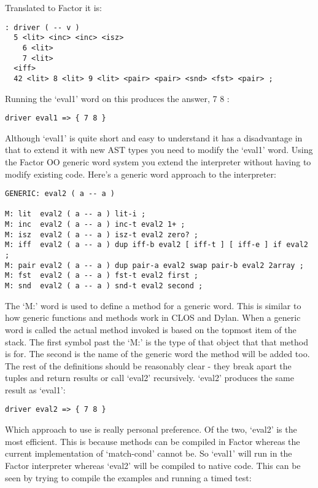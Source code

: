 Translated to Factor it is:

\begin{verbatim}
: driver ( -- v )
  5 <lit> <inc> <inc> <isz> 
    6 <lit>
    7 <lit>
  <iff> 
  42 <lit> 8 <lit> 9 <lit> <pair> <pair> <snd> <fst> <pair> ;
\end{verbatim}

Running the `eval1' word on this produces the answer, { 7 8 }:

\begin{verbatim}
driver eval1 => { 7 8 }
\end{verbatim}

Although `eval1' is quite short and easy to understand it has a
disadvantage in that to extend it with new AST types you need to
modify the `eval1' word. Using the Factor OO generic word system you
extend the interpreter without having to modify existing code. Here's
a generic word approach to the interpreter:

\begin{verbatim}
GENERIC: eval2 ( a -- a )

M: lit  eval2 ( a -- a ) lit-i ;
M: inc  eval2 ( a -- a ) inc-t eval2 1+ ;
M: isz  eval2 ( a -- a ) isz-t eval2 zero? ;
M: iff  eval2 ( a -- a ) dup iff-b eval2 [ iff-t ] [ iff-e ] if eval2 ;
M: pair eval2 ( a -- a ) dup pair-a eval2 swap pair-b eval2 2array ;
M: fst  eval2 ( a -- a ) fst-t eval2 first ;
M: snd  eval2 ( a -- a ) snd-t eval2 second ;
\end{verbatim}

The `M:' word is used to define a method for a generic word. This is
similar to how generic functions and methods work in CLOS and
Dylan. When a generic word is called the actual method invoked is
based on the topmost item of the stack. The first symbol past the `M:'
is the type of that object that that method is for. The second is the
name of the generic word the method will be added too. The rest of the
definitions should be reasonably clear - they break apart the tuples
and return results or call `eval2' recursively. `eval2' produces the
same result as `eval1':

\begin{verbatim}
driver eval2 => { 7 8 }
\end{verbatim}

Which approach to use is really personal preference. Of the two,
`eval2' is the most efficient. This is because methods can be compiled
in Factor whereas the current implementation of `match-cond' cannot
be. So `eval1' will run in the Factor interpreter whereas `eval2' will
be compiled to native code. This can be seen by trying to compile the
examples and running a timed test:

